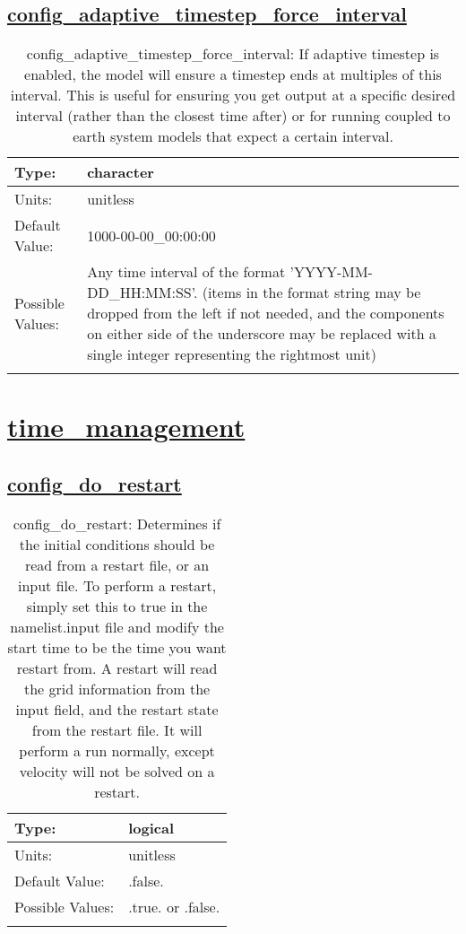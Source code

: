 \subsection[config\_adaptive\_timestep\_force\_interval]{\hyperref[sec:nm_tab_time_integration]{config\_adaptive\_timestep\_force\_interval}}
\label{subsec:nm_sec_config_adaptive_timestep_force_interval}
\begin{center}
\begin{longtable}{| p{2.0in} || p{4.0in} |}
    \hline
    Type: & character \\
    \hline
    Units: & \si{unitless} \\
    \hline
    Default Value: & 1000-00-00\_00:00:00 \\
    \hline
    Possible Values: & Any time interval of the format 'YYYY-MM-DD\_HH:MM:SS'. (items in the format string may be dropped from the left if not needed, and the components on either side of the underscore may be replaced with a single integer representing the rightmost unit) \\
    \hline
    \caption{config\_adaptive\_timestep\_force\_interval: If adaptive timestep is enabled, the model will ensure a timestep ends at multiples of this interval.  This is useful for ensuring you get output at a specific desired interval (rather than the closest time after) or for running coupled to earth system models that expect a certain interval.}
\end{longtable}
\end{center}
\section[time\_management]{\hyperref[sec:nm_tab_time_management]{time\_management}}
\label{sec:nm_sec_time_management}
\subsection[config\_do\_restart]{\hyperref[sec:nm_tab_time_management]{config\_do\_restart}}
\label{subsec:nm_sec_config_do_restart}
\begin{center}
\begin{longtable}{| p{2.0in} || p{4.0in} |}
    \hline
    Type: & logical \\
    \hline
    Units: & \si{unitless} \\
    \hline
    Default Value: & .false. \\
    \hline
    Possible Values: & .true. or .false. \\
    \hline
    \caption{config\_do\_restart: Determines if the initial conditions should be read from a restart file, or an input file.  To perform a restart, simply set this to true in the namelist.input file and modify the start time to be the time you want restart from.  A restart will read the grid information from the input field, and the restart state from the restart file.  It will perform a run normally, except velocity will not be solved on a restart.}
\end{longtable}
\end{center}
